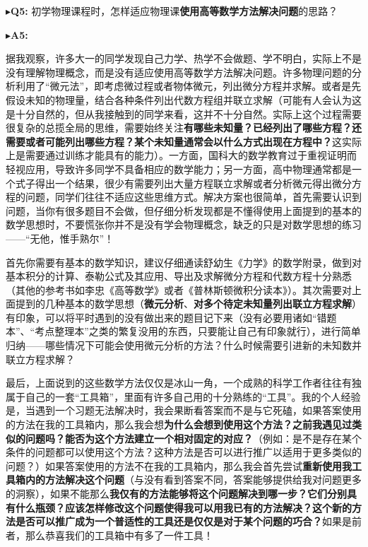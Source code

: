 \documentclass{ctexart}
\begin{document}
\noindent$\blacktriangleright$\;\textbf{Q5:} 初学物理课程时，怎样适应物理课\textbf{使用高等数学方法解决问题}的思路？

\noindent$\blacktriangleright$\;\textbf{A5:}

据我观察，许多大一的同学发现自己力学、热学不会做题、学不明白，实际上不是没有理解物理概念，而是没有适应使用高等数学方法解决问题。许多物理问题的分析利用了“微元法”，即考虑微过程或者物体微元，列出微分方程并求解。或者是先假设未知的物理量，结合各种条件列出代数方程组并联立求解（可能有人会认为这是十分自然的，但从我接触到的同学来看，这并不十分自然。实际上这个过程需要很复杂的总揽全局的思维，需要始终关注\textbf{有哪些未知量？已经列出了哪些方程？还需要或者可能列出哪些方程？某个未知量通常会以什么方式出现在方程中？}这实际上是需要通过训练才能具有的能力）。一方面，国科大的数学教育过于重视证明而轻视应用，导致许多同学不具备相应的数学能力；另一方面，高中物理通常都是一个式子得出一个结果，很少有需要列出大量方程联立求解或者分析微元得出微分方程的问题，同学们往往不适应这些思维方式。解决方案也很简单，首先需要认识到问题，当你有很多题目不会做，但仔细分析发现都是不懂得使用上面提到的基本的数学思想时，不要慌张你并不是没有学会物理概念，缺乏的只是对数学思想的练习——“无他，惟手熟尔”！

首先你需要有基本的数学知识，建议仔细通读舒幼生《力学》的数学附录，做到对基本积分的计算、泰勒公式及其应用、导出及求解微分方程和代数方程十分熟悉（其他的参考书如李忠《高等数学》或者《普林斯顿微积分读本》）。其次需要对上面提到的几种基本的数学思想（\textbf{微元分析}、\textbf{对多个待定未知量列出联立方程求解}）有印象，可以将平时遇到的没有做出来的题目记下来（没有必要用诸如“错题本”、“考点整理本”之类的繁复没用的东西，只要能让自己有印象就行），进行简单归纳——哪些情况下可能会使用微元分析的方法？什么时候需要引进新的未知数并联立方程求解？

最后，上面说到的这些数学方法仅仅是冰山一角，一个成熟的科学工作者往往有独属于自己的一套“工具箱”，里面有许多自己用的十分熟练的“工具”。我的个人经验是，当遇到一个习题无法解决时，我会果断看答案而不是与它死磕，如果答案使用的方法在我的工具箱内，那么我会想\textbf{为什么会想到使用这个方法？之前我遇见过类似的问题吗？能否为这个方法建立一个相对固定的对应？}（例如：是不是存在某个条件的问题都可以使用这个方法？这种方法是否可以进行推广以适用于更多类似的问题？）如果答案使用的方法不在我的工具箱内，那么我会首先尝试\textbf{重新使用我工具箱内的方法解决这个问题}（与没有看到答案不同，答案能够提供给我对问题更多的洞察），如果不能那么\textbf{我仅有的方法能够将这个问题解决到哪一步？它们分别具有什么瓶颈？应该怎样修改这个问题使得我可以用我已有的方法解决？这个新的方法是否可以推广成为一个普适性的工具还是仅仅是对于某个问题的巧合？}如果是前者，那么恭喜我们的工具箱中有多了一件工具！
\end{document}
